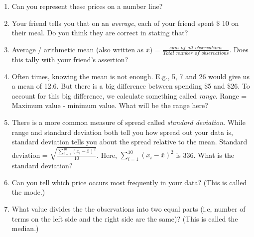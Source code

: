 \documentclass[10pt]{article}
\begin{document}
\begin{enumerate}
	
	\item Can you represent these prices on a number line?
	\vspace{2cm}
	
	\item Your friend tells you that on an \emph{average}, each of your friend spent \$ 10 on their meal. Do you think they are correct in stating that?
	\vspace{1.5cm}
	
	\item Average / arithmetic mean (also written as $\bar{x}$) = $\frac{sum \hspace{5pt} of \hspace{5pt} all \hspace{5pt} observations}{Total \hspace{5pt} number \hspace{5pt} of \hspace{5pt} observations}$. Does this tally with your friend's assertion?
	\vspace{1.5cm}
	
	\item Often times, knowing the mean is not enough. E.g., 5, 7 and 26 would give us a mean of 12.6. But there is a big difference between spending \$5 and \$26. To account for this big difference, we calculate something called \emph{range}. Range = Maximum value - minimum value. What will be the range here?
	\vspace{1.5cm}
	
	\item There is a more common measure of spread called \emph{standard deviation}. While range and standard deviation both tell you how spread out your data is, standard deviation tells you about the spread relative to the mean. 
	Standard deviation = $\sqrt{\frac{\sum_{i=1}^{10}(x_i - \bar{x})^2}{10}}$. Here, $\sum_{i=1}^{10}(x_i - \bar{x})^2$ is 336. What is the standard deviation?
	\vspace{1.5cm}
	
	\item Can you tell which price occurs most frequently in your data? (This is called the mode.)
	\vspace{1.5cm}
	
	\item What value divides the the observations into two equal parts (i.e, number of terms on the left side and the right side are the same)? (This is called the median.)
	\vspace{1.5cm}
	

\end{enumerate}
\end{document}
